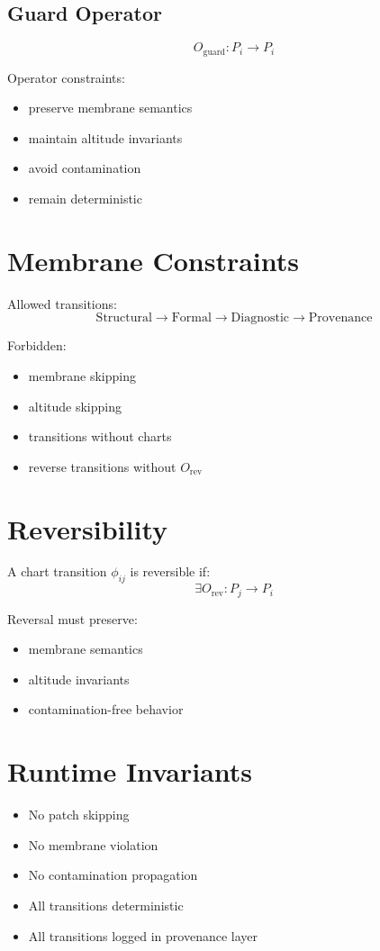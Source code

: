 \documentclass[12pt]{article}
\begin{document}
\subsection{Guard Operator}
\[
O_{\text{guard}} : P_i \rightarrow P_i
\]

Operator constraints:
\begin{itemize}
  \item preserve membrane semantics
  \item maintain altitude invariants
  \item avoid contamination
  \item remain deterministic
\end{itemize}

\section{Membrane Constraints}

Allowed transitions:
\[
\text{Structural} \rightarrow \text{Formal} \rightarrow \text{Diagnostic} \rightarrow \text{Provenance}
\]

Forbidden:
\begin{itemize}
  \item membrane skipping
  \item altitude skipping
  \item transitions without charts
  \item reverse transitions without $O_{\text{rev}}$
\end{itemize}

\section{Reversibility}

A chart transition $\phi_{ij}$ is reversible if:
\[
\exists O_{\text{rev}} : P_j \rightarrow P_i
\]

Reversal must preserve:
\begin{itemize}
  \item membrane semantics
  \item altitude invariants
  \item contamination-free behavior
\end{itemize}

\section{Runtime Invariants}

\begin{itemize}
  \item No patch skipping
  \item No membrane violation
  \item No contamination propagation
  \item All transitions deterministic
  \item All transitions logged in provenance layer
\end{itemize}
\end{document}
